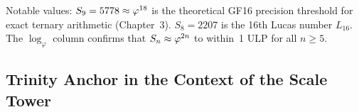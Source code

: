 \begin{table}[htbp]
\centering
\caption{Extended golden-scale sequence \(S_n = 3S_{n-1}-S_{n-2}\).}
\label{tab:gs-recurrence}
\end{table}

Notable values: \(S_9 = 5778 \approx \varphi^{18}\) is the
theoretical GF16 precision threshold for exact ternary arithmetic
(Chapter~3).  \(S_8 = 2207\) is the 16th Lucas number \(L_{16}\).
The \(\log_\varphi\) column confirms that \(S_n \approx \varphi^{2n}\)
to within~1 ULP for all \(n \ge 5\).

\subsection{Trinity Anchor in the Context of the Scale Tower}
\label{subsec:gs-anchor-tower}

